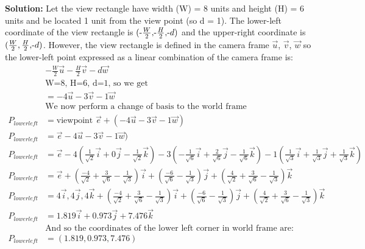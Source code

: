\documentclass[a4paper, 12pt]{article}
\begin{document}
\begin{enumerate}
        \textbf{Solution:} Let the view rectangle have width (W) = 8 units and height (H) = 6 units and be located 1 unit from the view point (so d = 1). The lower-left coordinate of the view rectangle is \( ( $-$\frac{W}{2}, $-$\frac{H}{2}, $-$d) \) and the upper-right coordinate is \( (\frac{W}{2}, \frac{H}{2}, $-$d) \). However, the view rectangle is defined in the camera frame $\vec{u}$, $\vec{v}$, $\vec{w}$ so the lower-left point expressed as a linear combination of the camera frame is:
        \begin{align*}
            &-\frac{W}{2}\vec{u} - \frac{H}{2}\vec{v} -d\vec{w}\\
            &\text{W=8, H=6, d=1, so we get}\\
            &= -4\vec{u} - 3\vec{v} -1\vec{w}\\
            &\text{We now perform a change of basis to the world frame}\\
            P_{lower left} &= \text{viewpoint $\vec{e}$} + (-4\vec{u} - 3\vec{v} -1\vec{w})\\
            P_{lower left} &= \vec{e} -4\vec{u} - 3\vec{v} -1\vec{w})\\
            P_{lower left} &= \vec{e} -4\left(\tfrac{1}{\sqrt{2}}\vec{i} + 0\vec{j} -\tfrac{1}{\sqrt{2}}\vec{k}\right) - 3\left( -\tfrac{1}{\sqrt{6}}\vec{i} + \tfrac{2}{\sqrt{6}}\vec{j} -\tfrac{1}{\sqrt{6}}\vec{k} \right) - 1\left(\tfrac{1}{\sqrt{3}}\vec{i} + \tfrac{1}{\sqrt{3}}\vec{j} + \tfrac{1}{\sqrt{3}}\vec{k}\right)\\
            P_{lower left} &= \vec{e} + \left( \tfrac{-4}{\sqrt{2}} + \tfrac{3}{\sqrt{6}} -\tfrac{1}{\sqrt{3}} \right) \vec{i} + \left(\tfrac{-6}{\sqrt{6}} - \tfrac{1}{\sqrt{3}} \right) \vec{j} + \left( \tfrac{4}{\sqrt{2}} +\tfrac{3}{\sqrt{6}} - \tfrac{1}{\sqrt{3}} \right) \vec{k}\\
            P_{lower left} &= 4\vec{i}, 4\vec{j}, 4\vec{k} + \left( \tfrac{-4}{\sqrt{2}} + \tfrac{3}{\sqrt{6}} -\tfrac{1}{\sqrt{3}} \right) \vec{i} + \left(\tfrac{-6}{\sqrt{6}} - \tfrac{1}{\sqrt{3}} \right) \vec{j} + \left( \tfrac{4}{\sqrt{2}} +\tfrac{3}{\sqrt{6}} - \tfrac{1}{\sqrt{3}} \right) \vec{k}\\
            P_{lower left} &= 1.819\vec{i} + 0.973\vec{j} + 7.476\vec{k}\\
            &\text{And so the coordinates of the lower left corner in world frame are:}\\
            P_{lower left} &= (1.819, 0.973, 7.476)\\
        \end{align*}

\end{enumerate}
\end{document}
